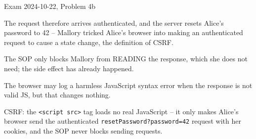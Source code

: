 \documentclass[12pt, a4paper]{article}
\begin{document}
\begin{practicebox}{Exam 2024-10-22, Problem 4b}
\begin{itemize}
    The request therefore arrives authenticated, and the server resets Alice's password to 42 -- Mallory tricked Alice's browser into making an authenticated request to cause a state change, the definition of CSRF.

    The SOP only blocks Mallory from READING the response, which she does not need; the side effect has already happened.

    The browser may log a harmless JavaScript syntax error when the response is not valid JS, but that changes nothing.
\end{itemize}

\begin{answerbox}
CSRF: the \texttt{<script src>} tag loads no real JavaScript -- it only makes Alice's browser send the authenticated \texttt{resetPassword?password=42} request with her cookies, and the SOP never blocks sending requests.
\end{answerbox}
\end{practicebox}
\end{document}
